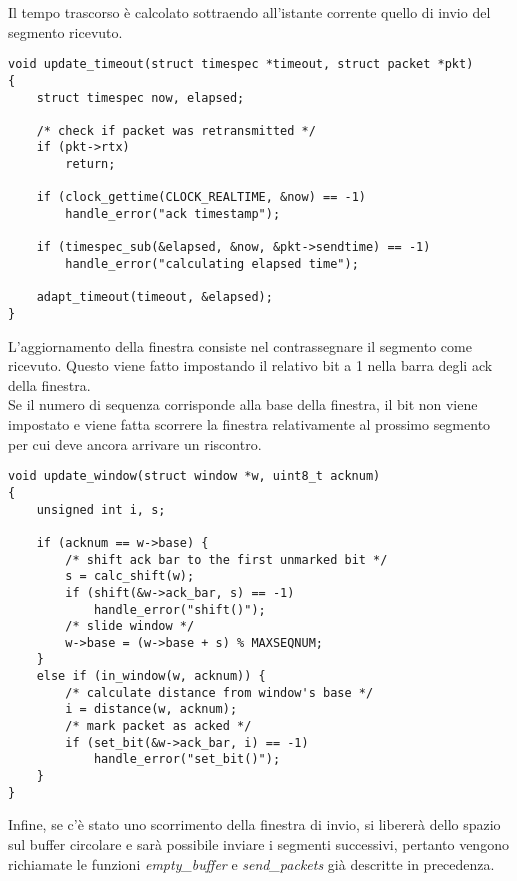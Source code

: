 Il tempo trascorso è calcolato sottraendo all'istante corrente quello di invio
del segmento ricevuto.
\begin{lstlisting}[title=transport.c]
void update_timeout(struct timespec *timeout, struct packet *pkt)
{
    struct timespec now, elapsed;

    /* check if packet was retransmitted */
    if (pkt->rtx)
        return;

    if (clock_gettime(CLOCK_REALTIME, &now) == -1)
        handle_error("ack timestamp");

    if (timespec_sub(&elapsed, &now, &pkt->sendtime) == -1)
        handle_error("calculating elapsed time");

    adapt_timeout(timeout, &elapsed);
}
\end{lstlisting}
L'aggiornamento della finestra consiste nel contrassegnare il segmento come
ricevuto. Questo viene fatto impostando il relativo bit a 1 nella barra degli
ack della finestra.\\
Se il numero di sequenza corrisponde alla base della finestra, il bit non viene
impostato e viene fatta scorrere la finestra relativamente al prossimo segmento
per cui deve ancora arrivare un riscontro.
\begin{lstlisting}[title=window.c]
void update_window(struct window *w, uint8_t acknum)
{
    unsigned int i, s;

    if (acknum == w->base) {
        /* shift ack bar to the first unmarked bit */
        s = calc_shift(w);
        if (shift(&w->ack_bar, s) == -1)
            handle_error("shift()");
        /* slide window */
        w->base = (w->base + s) % MAXSEQNUM;
    }
    else if (in_window(w, acknum)) {
        /* calculate distance from window's base */
        i = distance(w, acknum);
        /* mark packet as acked */
        if (set_bit(&w->ack_bar, i) == -1)
            handle_error("set_bit()");
    }
}
\end{lstlisting}
Infine, se c'è stato uno scorrimento della finestra di invio, si libererà
dello spazio sul buffer circolare e sarà possibile 
inviare i segmenti successivi, pertanto vengono richiamate le funzioni
\emph{empty\_buffer} e \emph{send\_packets} già descritte in precedenza.

